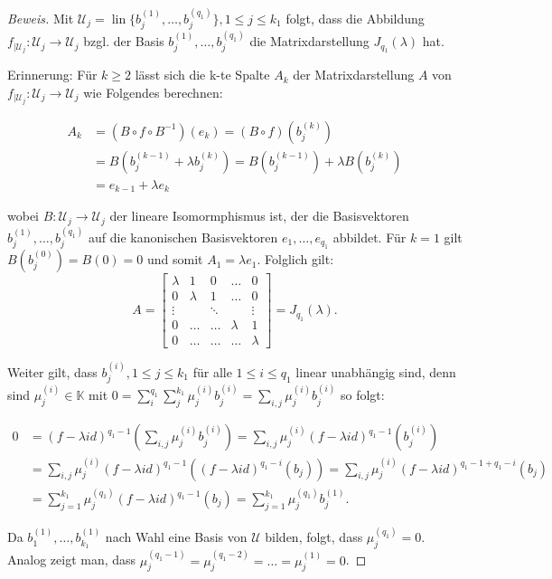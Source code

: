 \documentclass{article}
\newcommand{\U}{\mathcal{U}}
\newcommand{\K}{\mathbb{K}}
\newcommand{\basis}[2]{b_{#1}^{({#2})}}
\newcommand{\basislist}[2]{\basis{{#1}}{1}, \dots , \basis{{#1}}{{#2}}}
\newcommand{\basislistbot}[2]{\basis{1}{{#2}}, \dots , \basis{{#1}}{{#2}}}
\newcommand{\lam}{\lambda}
\newcommand{\flam}[1]{(f-{\lambda}id)^{{#1}}}
\newcommand{\funcdown}[2]{{{#1}}_{|{#2}}\colon{#2}\to{#2}}
\newcommand{\jmatrix}{
  \begin{bmatrix}
    \lam   & 1     & 0      & \dots & 0      \\
    0      & \lam  & 1      & \dots & 0      \\
    \vdots &       & \ddots &       & \vdots \\
    0      & \dots & \dots  & \lam  & 1      \\
    0      & \dots & \dots  & \dots & \lam
  \end{bmatrix}}
\DeclareMathOperator{\lin}{lin}
\begin{document}
\begin{proof}[Beweis]
  Mit $\U_j = \lin \{\basis{j}{1}, \dots , \basis{j}{q_1}\}, 1 \le j \le k_1$ folgt, dass
  die Abbildung $\funcdown{f}{\U_j}$ bzgl. der Basis $\basis{j}{1}, \dots ,\basis{j}{q_1}$
  die Matrixdarstellung $J_{q_1}(\lam)$ hat. 
  
  \begin{tcolorbox}
    Erinnerung: Für $k \ge 2$ lässt sich die k-te Spalte ${A}_k$ der Matrixdarstellung ${A}$ von $\funcdown{f}{\U_j}$ wie Folgendes berechnen:

    \begin{align*}
      A_k & = (B \circ f \circ B^{-1})(e_k) 
            = (B \circ f)(\basis{j}{k}) \\
          & = B(\basis{j}{k-1} + \lam \basis{j}{k})
           = B(\basis{j}{k-1}) + \lam B(\basis{j}{k}) \\
          & = e_{k-1} + \lam e_k
    \end{align*}

    wobei $B \colon \U_j \to \U_j$ der lineare Isomormphismus ist, der die Basisvektoren
    $\basislist{j}{q_1}$ auf die kanonischen Basisvektoren $e_1, \dots , e_{q_1}$ abbildet.
    Für $k=1$ gilt $B(\basis{j}{0}) = B(0) = 0$ und somit $A_1 = \lam e_1$. Folglich gilt:
    \begin{equation*}
      A = \jmatrix = J_{q_1}(\lam).
    \end{equation*}

  \end{tcolorbox}

  Weiter gilt, dass $\basis{j}{i}, 1 \le j \le k_1$ für alle $1 \le i \le q_1$ linear
  unabhängig sind, denn sind $\mu_{j}^{(i)} \in \K$ mit
  $0 = \sum_{i}^{q_1}\sum_{j}^{k_1}\mu_j^{(i)}\basis{j}{i} = \sum_{i,j}\mu_j^{(i)}\basis{j}{i}$
  so folgt:

  \begin{align*}
    0 & = \flam{q_1-1}(\sum_{i,j}\mu_j^{(i)}\basis{j}{i})
        = \sum_{i,j}\mu_j^{(i)} \flam{q_1-1}(\basis{j}{i}) \\
      & = \sum_{i,j}\mu_j^{(i)} \flam{q_1-1}(\flam{q_1-i}(b_j))
        = \sum_{i,j}\mu_j^{(i)} \flam{q_1-1+q_1-i}(b_j) \\
      & = \sum_{j=1}^{k_1}\mu_j^{(q_1)} \flam{q_1-1}(b_j)
        = \sum_{j=1}^{k_1}\mu_j^{(q_1)} \basis{j}{1}.
  \end{align*}

  Da $\basislistbot{k_1}{1}$ nach Wahl eine Basis von $\U$ bilden, folgt,
  dass $\mu_j^{(q_1)} = 0$. Analog zeigt man, dass
  $\mu_{j}^{(q_1-1)} = \mu_{j}^{(q_1-2)} = \dots = \mu_{j}^{(1)} = 0$.


\end{proof}
\end{document}
